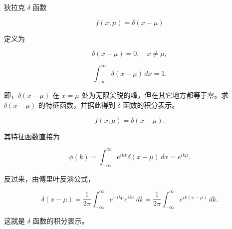 \begin{question}
狄拉克 \(\delta\) 函数

\[
f(x;\mu)=\delta(x-\mu)
\]

定义为

\[
\delta(x-\mu)=0,\quad x\ne\mu,
\]

\[
\int_{-\infty}^{\infty}\delta(x-\mu)\,dx=1.
\]

即，\(\delta(x-\mu)\) 在 \(x=\mu\)
处为无限尖锐的峰，但在其它地方都等于零。求 \(\delta(x-\mu)\)
的特征函数，并据此得到 \(\delta\) 函数的积分表示。
\begin{solution}
\[
f(x;\mu)=\delta(x-\mu).
\]

其特征函数直接为

\[
\phi(k)=\int_{-\infty}^{\infty} e^{ikx}\delta(x-\mu)\,dx=e^{ik\mu}.
\]

反过来，由傅里叶反演公式，

\[
\delta(x-\mu)=\frac{1}{2\pi}\int_{-\infty}^{\infty} e^{-ik\mu}e^{ikx}\,dk
=\frac1{2\pi}\int_{-\infty}^{\infty} e^{ik(x-\mu)}\,dk .
\]

这就是 \(\delta\) 函数的积分表示。
\end{solution}
\end{question}

